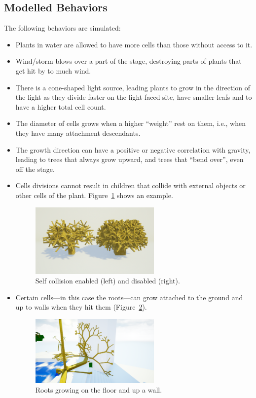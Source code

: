 \documentclass[11pt, abstract=on]{scrartcl}
\begin{document}
\subsection{Modelled Behaviors} \label{cptr:Influencing}
The following behaviors are simulated:
\begin{itemize}
	\item Plants in water are allowed to have more cells than those without access to it.
	\item Wind/storm blows over a part of the stage, destroying parts of plants that get hit by to much wind.
	\item There is a cone-shaped light source, leading plants to grow in the direction of the light as they divide faster on the light-faced site, have smaller leafs and to have a higher total cell count.
	\item The diameter of cells grows when a higher ``weight'' rest on them, i.e., when they have many attachment descendants.
	\item The growth direction can have a positive or negative correlation with gravity, leading to trees that always grow upward, and trees that ``bend over'', even off the stage.
	\item Cells divisions cannot result in children that collide with external objects or other cells of the plant. Figure~\ref{fig:SelfCollision} shows an example.
		\begin{figure} 
 		 \centering
 		    \includegraphics[width=0.6\textwidth]{SS_SelfCollision.png}
 		 \caption{Self collision enabled (left) and disabled (right).}
 		 \label{fig:SelfCollision}
	\end{figure}
	\item Certain cells---in this case the roots---can grow attached to the ground and up to walls when they hit them (Figure~\ref{fig:RootsOnFloor}).
	\begin{figure} 
 		 \centering
 		    \includegraphics[width=0.6\textwidth]{SS_Roots.png}
 		 \caption{Roots growing on the floor and up a wall.}
 		 \label{fig:RootsOnFloor}
	\end{figure}
\end{itemize}
\end{document}
